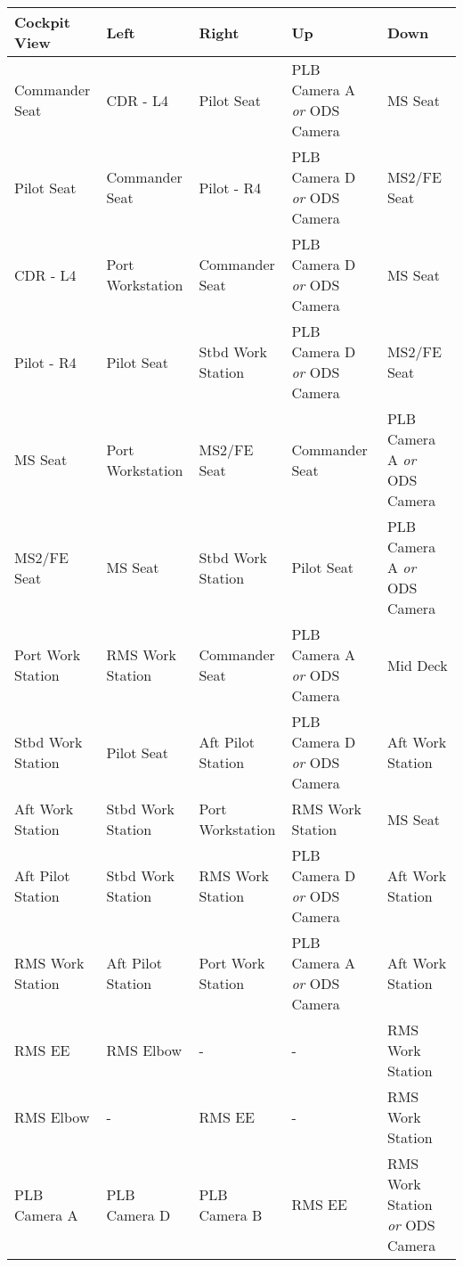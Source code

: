 \documentclass[Space_Shuttle_Vessel_Manual.tex]{subfiles}
\begin{document}
\begin{table}[H]
\begin{threeparttable}
  \centering
  \begin{tabular}{l|p{2.88cm} p{2.88cm} p{2.88cm} p{2.88cm} }
	\textbf{Cockpit View} & \textbf{Left} & \textbf{Right} & \textbf{Up} & \textbf{Down} \\
	\hline\rule{0pt}{2ex}
	Commander Seat & CDR - L4 & Pilot Seat & PLB Camera A \textit{or} ODS Camera\tnote{c} & MS Seat \\
	\hline\rule{0pt}{2ex}
	Pilot Seat & Commander Seat & Pilot - R4 & PLB Camera D \textit{or} ODS Camera\tnote{c} & MS2/FE Seat \\
	\hline\rule{0pt}{2ex}
	CDR - L4 & Port Workstation & Commander Seat & PLB Camera D \textit{or} ODS Camera\tnote{c} & MS Seat \\
	\hline\rule{0pt}{2ex}
	Pilot - R4 & Pilot Seat & Stbd Work Station & PLB Camera D \textit{or} ODS Camera\tnote{c} & MS2/FE Seat \\
	\hline\rule{0pt}{2ex}
	MS Seat & Port Workstation & MS2/FE Seat & Commander Seat & PLB Camera A \textit{or} ODS Camera\tnote{c}\\
	\hline\rule{0pt}{2ex}
	MS2/FE Seat & MS Seat & Stbd Work Station & Pilot Seat & PLB Camera A \textit{or} ODS Camera\tnote{c}\\
	\hline\rule{0pt}{2ex}
	Port Work Station & RMS Work Station & Commander Seat & PLB Camera A \textit{or} ODS Camera\tnote{c} & Mid Deck\\
	\hline\rule{0pt}{2ex}
	Stbd Work Station & Pilot Seat & Aft Pilot Station & PLB Camera D \textit{or} ODS Camera\tnote{c} & Aft Work Station\\
	\hline\rule{0pt}{2ex}
	Aft Work Station & Stbd Work Station & Port Workstation & RMS Work Station & MS Seat\\
	\hline\rule{0pt}{2ex}
	Aft Pilot Station & Stbd Work Station & RMS Work Station & PLB Camera D \textit{or} ODS Camera\tnote{c} & Aft Work Station\\
	\hline\rule{0pt}{2ex}
	RMS Work Station & Aft Pilot Station & Port Work Station & PLB Camera A \textit{or} ODS Camera\tnote{c} & Aft Work Station\\
	\hline\rule{0pt}{2ex}
	RMS EE\tnote{a} & RMS Elbow & - & - & RMS Work Station\\
	\hline\rule{0pt}{2ex}
	RMS Elbow\tnote{a} & - & RMS EE & - & RMS Work Station\\
	\hline\rule{0pt}{2ex}
	PLB Camera A & PLB Camera D & PLB Camera B & RMS EE\tnote{a,c} & RMS Work Station \textit{or} ODS Camera\tnote{c}\\

\end{tabular}
\end{threeparttable}
\end{table}
\end{document}
